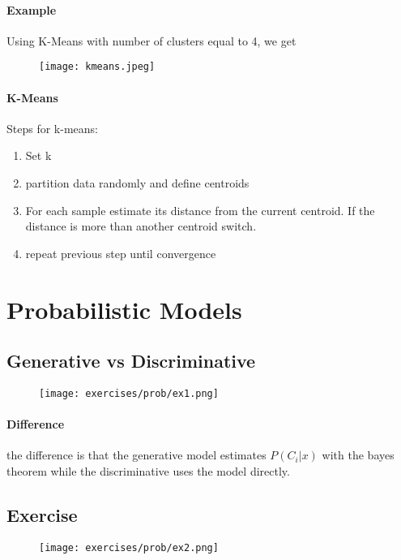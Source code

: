 \paragraph{Example}
Using K-Means with number of clusters equal to 4, we get 

\begin{figure}[H]
    \centering
    \texttt{[image: kmeans.jpeg]}
\end{figure}

\paragraph{K-Means}
Steps for k-means:
\begin{enumerate}
\item Set k
\item partition data randomly and define centroids
\item For each sample estimate its distance from the current centroid. If the distance is more than another centroid switch.
\item repeat previous step until convergence
\end{enumerate}


\section{Probabilistic Models}

\subsection{Generative vs Discriminative}

\begin{figure}[H]
    \centering
    \texttt{[image: exercises/prob/ex1.png]}
\end{figure}

\paragraph{Difference}
the difference is that the generative model estimates $P(C_i|x)$ with the bayes theorem while the discriminative uses the model directly.


\subsection{Exercise}

\begin{figure}[H]
    \centering
    \texttt{[image: exercises/prob/ex2.png]}
\end{figure}


